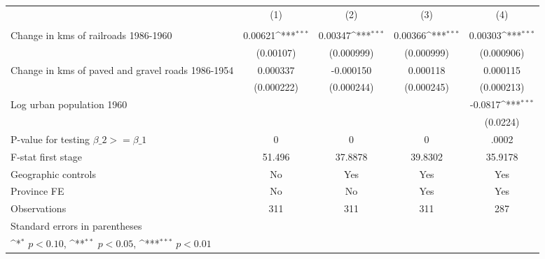 {
\def\sym#1{\ifmmode^{#1}\else\(^{#1}\)\fi}
\begin{tabular}{l*{4}{c}}
\hline\hline
                &\multicolumn{1}{c}{(1)}&\multicolumn{1}{c}{(2)}&\multicolumn{1}{c}{(3)}&\multicolumn{1}{c}{(4)}\\
                &\multicolumn{1}{c}{}&\multicolumn{1}{c}{}&\multicolumn{1}{c}{}&\multicolumn{1}{c}{}\\
\hline
Change in kms of railroads 1986-1960&  0.00621\sym{***}&  0.00347\sym{***}&  0.00366\sym{***}&  0.00303\sym{***}\\
                &(0.00107)         &(0.000999)         &(0.000999)         &(0.000906)         \\
[1em]
Change in kms of paved and gravel roads 1986-1954& 0.000337         &-0.000150         & 0.000118         & 0.000115         \\
                &(0.000222)         &(0.000244)         &(0.000245)         &(0.000213)         \\
[1em]
Log urban population 1960&                  &                  &                  &  -0.0817\sym{***}\\
                &                  &                  &                  & (0.0224)         \\
\hline
P-value for testing $\beta\_{2} >= \beta\_{1}$&        0         &        0         &        0         &    .0002         \\
F-stat first stage&   51.496         &  37.8878         &  39.8302         &  35.9178         \\
Geographic controls&       No         &      Yes         &      Yes         &      Yes         \\
Province FE     &       No         &       No         &      Yes         &      Yes         \\
Observations    &      311         &      311         &      311         &      287         \\
\hline\hline
\multicolumn{5}{l}{\footnotesize Standard errors in parentheses}\\
\multicolumn{5}{l}{\footnotesize \sym{*} \(p<0.10\), \sym{**} \(p<0.05\), \sym{***} \(p<0.01\)}\\
\end{tabular}
}
